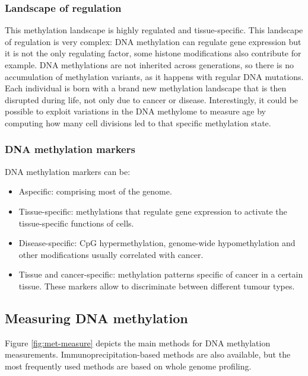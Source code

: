         \subsubsection{Landscape of regulation}
        This methylation landscape is highly regulated and tissue-specific.
        This landscape of regulation is very complex: DNA methylation can regulate gene expression but it is not the only regulating factor, some histone modifications also contribute for example.
        DNA methylations are not inherited across generations, so there is no accumulation of methylation variants, as it happens with regular DNA mutations.
        Each individual is born with a brand new methylation landscape that is then disrupted during life, not only due to cancer or disease.
        Interestingly, it could be possible to exploit variations in the DNA methylome to measure age by computing how many cell divisions led to that specific methylation state.

        \subsubsection{DNA methylation markers}
        DNA methylation markers can be:

        \begin{multicols}{2}
            \begin{itemize}
                \item Aspecific: comprising most of the genome.
                \item Tissue-specific: methylations that regulate gene expression to activate the tissue-specific functions of cells.
                \item Disease-specific: CpG hypermethylation, genome-wide hypomethylation and other modifications usually correlated with cancer.
                \item Tissue and cancer-specific: methylation patterns specific of cancer in a certain tissue.
                    These markers allow to discriminate between different tumour types.
            \end{itemize}
        \end{multicols}

    \subsection{Measuring DNA methylation}
    Figure \ref{fig:met-measure} depicts the main methods for DNA methylation measurements.
    Immunoprecipitation-based methods are also available, but the most frequently used methods are based on whole genome profiling.


